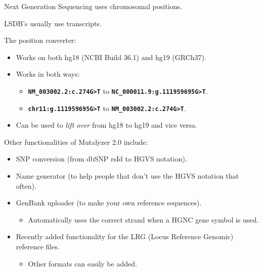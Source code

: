\documentclass[a4, portrait]{seminar}
\newcommand{\bt}[1]{\texttt{\textbf{#1}}}
\begin{document}
\begin{slide}

  Next Generation Sequencing uses chromosomal positions.

  LSDB's usually use transcripts.

  The position converter:
  \begin{itemize}
    \item Works on both hg18 (NCBI Build 36.1) and hg19 (GRCh37).
    \item Works in both ways:
    \begin{itemize}
      \item \bt{NM\_003002.2:c.274\yellow G\white >\yellow T\white} to
            \bt{NC\_000011.9:g.111959695\yellow G\white >\yellow T\white}.
      \item \bt{chr11:g.111959695\yellow G\white >\yellow T\white} to 
            \bt{NM\_003002.2:c.274\yellow G\white >\yellow T\white}.
    \end{itemize}
    \item Can be used to \emph{lift over} from hg18 to hg19 and vice versa.
  \end{itemize}

  \vfill
\end{slide}
  
\begin{slide}
  
  Other functionalities of Mutalyzer 2.0 include:
  \begin{itemize}
    \item SNP conversion (from dbSNP rsId to HGVS notation).
    \item Name generator (to help people that don't use the HGVS notation that
          often).
    \item GenBank uploader (to make your own reference sequences).
    \begin{itemize}
      \item Automatically uses the correct strand when a HGNC gene symbol is
            used.
    \end{itemize}
    \item Recently added functionality for the LRG (Locus Reference Genomic)
          reference files.
    \begin{itemize}
      \item Other formats can easily be added.
    \end{itemize}
  \end{itemize}
  \vfill
\end{slide}
\end{document}
